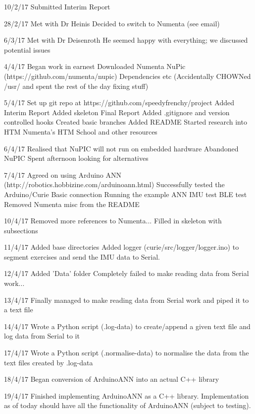 \documentclass[a4paper]{article}
\begin{document}
10/2/17
    Submitted Interim Report

28/2/17
    Met with Dr Heinis
    Decided to switch to Numenta (see email)

6/3/17
    Met with Dr Deisenroth
    He seemed happy with everything; we discussed potential issues

4/4/17
    Began work in earnest
    Downloaded Numenta NuPic (https://github.com/numenta/nupic)
        Dependencies etc
    (Accidentally CHOWNed /usr/ and spent the rest of the day fixing stuff)

5/4/17
    Set up git repo at https://github.com/speedyfrenchy/project
        Added Interim Report
        Added skeleton Final Report
        Added .gitignore and version controlled hooks
        Created basic branches
        Added README        
    Started research into HTM
        Numenta's HTM School and other resources

6/4/17
    Realised that NuPIC will not run on embedded hardware
    Abandoned NuPIC
    Spent afternoon looking for alternatives

7/4/17
    Agreed on using Arduino ANN (http://robotics.hobbizine.com/arduinoann.html)
    Successfully tested the Arduino/Curie
        Basic connection
        Running the example ANN
        IMU test
        BLE test
    Removed Numenta misc from the README

10/4/17
    Removed more references to Numenta...
    Filled in skeleton with subsections

11/4/17
    Added base directories
    Added logger (curie/src/logger/logger.ino) to segment exercises and send the IMU data to Serial.

12/4/17
    Added 'Data' folder
    Completely failed to make reading data from Serial work...

13/4/17
    Finally managed to make reading data from Serial work and piped it to a text file

14/4/17
    Wrote a Python script (.log-data) to create/append a given text file and log data from Serial to it

17/4/17
    Wrote a Python script (.normalise-data) to normalise the data from the text files created by .log-data

18/4/17
    Began conversion of ArduinoANN into an actual C++ library

19/4/17
    Finished implementing ArduinoANN as a C++ library. 
    Implementation as of today should have all the functionality of ArduinoANN (subject to testing).
\end{document}
